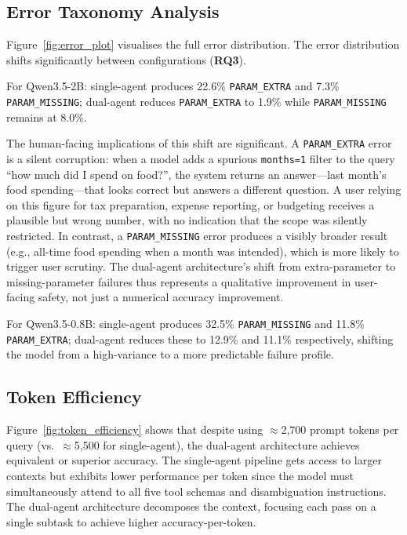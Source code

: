 \documentclass[11pt,twocolumn]{article}
\begin{document}
\subsection{Error Taxonomy Analysis}

Figure~\ref{fig:error_plot} visualises the full error distribution.
The error distribution shifts significantly between configurations
(\textbf{RQ3}).

For Qwen3.5-2B: single-agent produces 22.6\% \texttt{PARAM\_EXTRA}
and 7.3\% \texttt{PARAM\_MISSING}; dual-agent reduces
\texttt{PARAM\_EXTRA} to 1.9\% while \texttt{PARAM\_MISSING} remains
at 8.0\%.

The human-facing implications of this shift are significant.
A \texttt{PARAM\_EXTRA} error is a silent corruption: when a model
adds a spurious \texttt{months=1} filter to the query ``how much did I
spend on food?'', the system returns an answer---last month's food
spending---that looks correct but answers a different question.
A user relying on this figure for tax preparation, expense reporting,
or budgeting receives a plausible but wrong number, with no indication
that the scope was silently restricted.
In contrast, a \texttt{PARAM\_MISSING} error produces a visibly
broader result (e.g., all-time food spending when a month was
intended), which is more likely to trigger user scrutiny.
The dual-agent architecture's shift from extra-parameter to
missing-parameter failures thus represents a qualitative
improvement in user-facing safety, not just a numerical accuracy
improvement.

For Qwen3.5-0.8B: single-agent produces 32.5\%
\texttt{PARAM\_MISSING} and 11.8\% \texttt{PARAM\_EXTRA}; dual-agent
reduces these to 12.9\% and 11.1\% respectively, shifting the model
from a high-variance to a more predictable failure profile.

\subsection{Token Efficiency}

Figure~\ref{fig:token_efficiency} shows that despite using
$\approx$2,700 prompt tokens per query (vs.\ $\approx$5,500 for
single-agent), the dual-agent architecture achieves equivalent or
superior accuracy.
The single-agent pipeline gets access to larger contexts but exhibits lower
performance per token since the model must simultaneously attend to
all five tool schemas and disambiguation instructions.
The dual-agent architecture decomposes the context, focusing each pass
on a single subtask to achieve higher accuracy-per-token.
\end{document}
